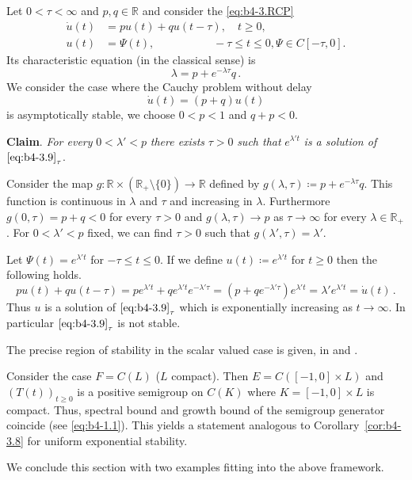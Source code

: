 Let $0 < \tau < \infty$ and $p,q \in \mathbb{R}$ and consider the \eqref{eq:b4-3.RCP}
\begin{equation}\label{eq:b4-3.9}
    \begin{aligned}
		\dot{u}(t) &= pu(t) + qu(t-\tau) , \quad t \geq 0 ,\\
		u(t) &= \Psi(t) , \quad\quad\quad\quad\quad\; -\tau \leq t \leq 0 , \Psi \in C[-\tau,0] .
	\end{aligned}
\end{equation}
Its characteristic equation (in the classical sense) is 
\begin{equation}\label{eq:b4-3.10}
\lambda = p + e^{-\lambda\tau}q\,.
\end{equation}
We consider the case where the Cauchy problem without delay
\[
\dot{u}(t) = (p + q)u(t)
\]
is asymptotically stable, \ie we choose $0 < p < 1$ and $q + p < 0$.

\textbf{Claim}.
	\textit{For every} $0 < \lambda' < p$ \textit{there exists} $\tau > 0$ \textit{such that} $e^{\lambda't}$ \textit{is a solution of} $\eqref{eq:b4-3.9}_{\tau}$.

Consider the map $g \colon \mathbb{R}\times(\mathbb{R}_{+}\setminus\{0\}) \to \mathbb{R}$ defined by $g(\lambda,\tau) \coloneqq p + e^{-\lambda\tau}q$.
This function is continuous in $\lambda$ and $\tau$ and increasing in $\lambda$.
Furthermore $g(0,\tau) = p + q < 0$ for every $\tau > 0$ and $g(\lambda,\tau) \to p$ as $\tau \to \infty$ for every $\lambda \in \mathbb{R}_{+}$.
For $0 < \lambda' < p$ fixed, we can find $\tau > 0$ such that $g(\lambda',\tau) = \lambda'$.

Let $\Psi(t) = e^{\lambda't}$ for $-\tau \leq t \leq 0$. 
If we define $u(t) \coloneq e^{\lambda't}$ for $t \geq 0$ then the following holds.
\[
pu(t) + qu(t-\tau) = pe^{\lambda't} + qe^{\lambda't}e^{-\lambda'\tau} = (p+qe^{-\lambda'\tau})e^{\lambda't} = \lambda'e^{\lambda't} = \dot{u}(t)\,.
\]
Thus $u$ is a solution of $\eqref{eq:b4-3.9}_{\tau}$ which is exponentially increasing as $t \to \infty$. 
In particular $\eqref{eq:b4-3.9}_{\tau}$ is not stable.

The precise region of stability in the scalar valued case is given, \eg in \citet{hadeler:1978}  and  \citet[p.107ff]{hale:1977}.

\begin{remark*}
	Consider the case $F = C(L)$ ($L$ compact).
	Then $E = C([-1,0] \times L)$ and $(T(t))_{t\geq0}$ is a positive semigroup on $C(K)$ where $K = [-1,0] \times L$ is compact. 
	Thus, spectral bound and growth bound of the semigroup generator coincide (see \eqref{eq:b4-1.1}). 
	This yields a statement analogous to Corollary~\ref{cor:b4-3.8} for uniform exponential stability.
\end{remark*}
We conclude this section with two examples fitting into the above framework.


